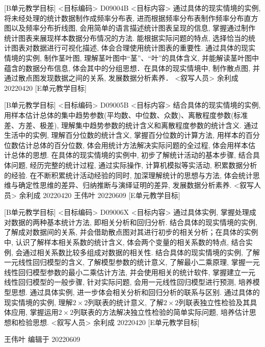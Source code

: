 \documentclass[10pt,a4paper]{article}
\begin{document}
[B单元教学目标]
<目标编码>
D09004B
<目标内容>
通过具体的现实情境的实例, 将未经处理的统计数据制作成频率分布表, 进而根据频率分布表制作频率分布直方图以及频率分布折线图, 会用简单的语言描述统计图表呈现的信息, 掌握通过制作统计图表来展现样本数据分布情况的方法. 能根据实际问题的特点, 选择恰当的统计图表对数据进行可视化描述, 体会合理使用统计图表的重要性. 通过具体的现实情境的实例, 制作茎叶图, 理解茎叶图中“茎”、“叶”的具体含义, 并能解读茎叶图中蕴含的数据分布信息, 体会其中的分组思想．在具体的现实情境中, 制作散点图, 并通过散点图发现数据之间的关系, 发展数据分析素养．
<叙写人员>
余利成  20220420
[E单元教学目标]

[B单元教学目标]
<目标编码>
D09005B
<目标内容>
结合具体的现实情境的实例, 用样本估计总体的集中趋势参数(平均数、中位数、众数)、离散程度参数(标准差、方差、极差), 理解集中趋势参数的统计含义和离散程度参数的统计含义. 通过生活中的实例, 理解百分位数的统计含义, 掌握百分位数的计算方法, 用样本的百分位数估计总体的百分位数, 体会用统计方法解决实际问题的全过程, 体会用样本估计总体的思想. 在具体的现实情境的实例中, 初步了解统计活动的基本步骤, 结合具体问题, 经历完整的统计过程, 通过实际操作, 计算机模拟等实活动, 积累数据分析的经验. 在不断积累统计活动经验的同时, 加深理解统计的思想与方法, 体会统计思维与确定性思维的差异、归纳推断与演绎证明的差异, 发展数据分析素养.
<叙写人员>
余利成  20220420
王伟叶  20220609
[E单元教学目标]
 

[B单元教学目标]
<目标编码>
D09006X
<目标内容>
通过具体实例, 掌握处理成对数据的两种基本统计方法, 即相关分析和回归分析. 结合具体的现实情境的实例, 了解成对数据间的关系, 并会借助散点图对其进行初步的相关分析；在具体的实例中, 认识了解样本相关系数的统计含义, 体会两个变量的相关系数的特点, 结合实例, 会通过相关系数比较多组成对数据的相关性. 结合具体的现实情境的实例, 了解一元线性回归模型的含义, 了解模型参数的统计意义, 了解最小二乘原理, 掌握一元线性回归模型参数的最小二乘估计方法, 并会使用相关的统计软件, 掌握建立一元线性回归模型的一般步骤, 针对实际问题, 会用一元线性回归模型进行预测, 培养模型思想. 通过具体实例, 进一步体会相关分析和回归分析的联系与区别. 通过具体的现实情境的实例, 理解$2\times 2$列联表的统计意义, 了解$2\times 2$列联表独立性检验及其具体应用, 掌握运用$2\times 2$列联表的方法解决独立性检验的简单实际问题, 培养估计思想和检验思想.
<叙写人员>
余利成  20220420
[E单元教学目标]

 王伟叶 编辑于 20220609
\end{document}
